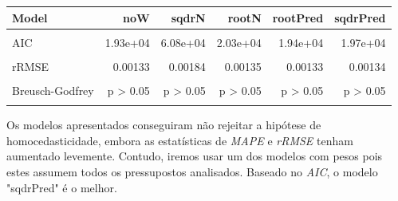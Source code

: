 \documentclass[justified, 11pt]{scrartcl}\usepackage[]{graphicx}\usepackage[]{xcolor}
\newenvironment{knitrout}{}{} %
\begin{document}
\begin{knitrout}
\begin{table}
\begin{tabular}{l|r|r|r|r|r}
\hline
Model & noW & sqdrN & rootN & rootPred & sqdrPred\\
\hline
\cellcolor{gray!6}{R2} & \cellcolor{gray!6}{0.402} & \cellcolor{gray!6}{0.954} & \cellcolor{gray!6}{0.361} & \cellcolor{gray!6}{0.409} & \cellcolor{gray!6}{0.43}\\
\hline
AIC & 1.93e+04 & 6.08e+04 & 2.03e+04 & 1.94e+04 & 1.97e+04\\
\hline
\cellcolor{gray!6}{MAPE} & \cellcolor{gray!6}{0.0858} & \cellcolor{gray!6}{0.129} & \cellcolor{gray!6}{0.0882} & \cellcolor{gray!6}{0.0859} & \cellcolor{gray!6}{0.0863}\\
\hline
rRMSE & 0.00133 & 0.00184 & 0.00135 & 0.00133 & 0.00134\\
\hline
\cellcolor{gray!6}{Breusch-Pagan} & \cellcolor{gray!6}{p = 3.1e-121} & \cellcolor{gray!6}{p > 0.05} & \cellcolor{gray!6}{p > 0.05} & \cellcolor{gray!6}{p = 1.09e-61} & \cellcolor{gray!6}{p > 0.05}\\
\hline
Breusch-Godfrey & p > 0.05 & p > 0.05 & p > 0.05 & p > 0.05 & p > 0.05\\
\hline
\cellcolor{gray!6}{Jarque-Bera} & \cellcolor{gray!6}{p < 0.05} & \cellcolor{gray!6}{p < 0.05} & \cellcolor{gray!6}{p < 0.05} & \cellcolor{gray!6}{p < 0.05} & \cellcolor{gray!6}{p < 0.05}\\
\hline
\end{tabular}
\endgroup{}
\end{table}

\end{knitrout}

Os modelos apresentados conseguiram não rejeitar a hipótese de homocedasticidade, embora as estatísticas de \textit{MAPE} e \textit{rRMSE} tenham aumentado levemente. Contudo, iremos usar um dos modelos com pesos pois estes assumem todos os pressupostos analisados. Baseado no \textit{AIC}, o modelo "sqdrPred" é o melhor.\\
\end{document}
